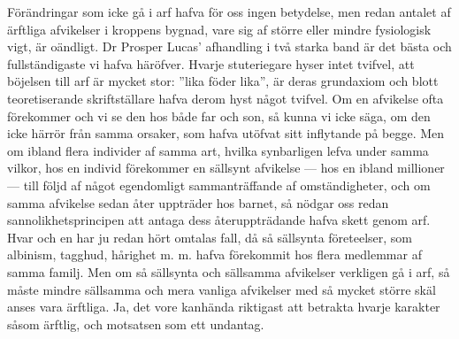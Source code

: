 Förändringar som icke gå i arf hafva för oss ingen betydelse, men redan antalet af ärftliga afvikelser i kroppens bygnad, vare sig af större eller mindre fysiologisk vigt, är oändligt. Dr Prosper Lucas’ afhandling i två starka band är det bästa och fullständigaste vi hafva häröfver. Hvarje stuteriegare hyser intet tvifvel, att böjelsen till arf är mycket stor: ”lika föder lika”, är deras grundaxiom och blott teoretiserande skriftställare hafva derom hyst något tvifvel. Om en afvikelse ofta förekommer och vi se den hos både far och son, så kunna vi icke säga, om den icke härrör från samma orsaker, som hafva utöfvat sitt inflytande på begge. Men om ibland flera individer af samma art, hvilka synbarligen lefva under samma vilkor, hos en individ förekommer en sällsynt afvikelse — hos en ibland millioner — till följd af något egendomligt sammanträffande af omständigheter, och om samma afvikelse sedan åter uppträder hos barnet, så nödgar oss redan sannolikhetsprincipen att antaga dess återuppträdande hafva skett genom arf. Hvar och en har ju redan hört omtalas fall, då så sällsynta företeelser, som albinism, tagghud, hårighet m. m. hafva förekommit hos flera medlemmar af samma familj. Men om så sällsynta och sällsamma afvikelser verkligen gå i arf, så måste mindre sällsamma och mera vanliga afvikelser med så mycket större skäl anses vara ärftliga. Ja, det vore kanhända riktigast att betrakta hvarje karakter såsom ärftlig, och motsatsen som ett undantag.

